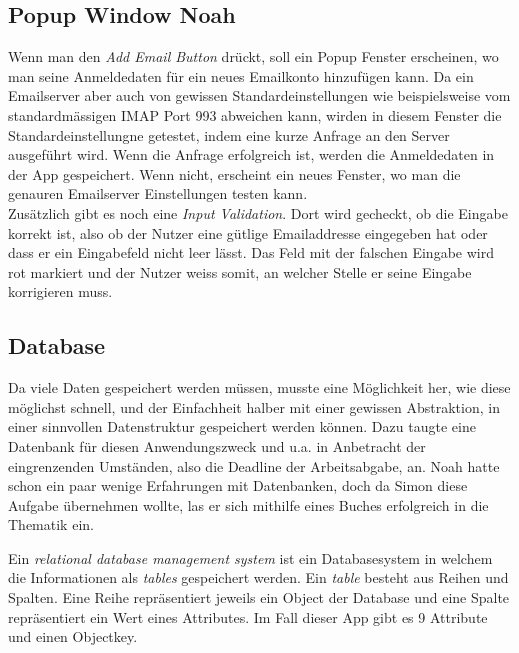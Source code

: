 \documentclass[a4paper,11pt]{article}
\begin{document}
\subsection{Popup Window Noah }
Wenn man den \textit{Add Email Button} drückt, soll ein Popup Fenster erscheinen, wo man seine Anmeldedaten für ein neues Emailkonto hinzufügen kann. Da ein Emailserver aber auch von gewissen Standardeinstellungen wie beispielsweise vom standardmässigen IMAP Port 993 abweichen kann, wirden in diesem Fenster die Standardeinstellungne getestet, indem eine kurze Anfrage an den Server ausgeführt wird. Wenn die Anfrage erfolgreich ist, werden die Anmeldedaten in der App gespeichert. Wenn nicht, erscheint ein neues Fenster, wo man die genauren Emailserver Einstellungen testen kann.\\

Zusätzlich gibt es noch eine \textit{Input Validation}. Dort wird gecheckt, ob die Eingabe korrekt ist, also ob der Nutzer eine gütlige Emailaddresse eingegeben hat oder dass er ein Eingabefeld nicht leer lässt. Das Feld mit der falschen Eingabe wird rot markiert und der Nutzer weiss somit, an welcher Stelle er seine Eingabe korrigieren muss.

\subsection{Database}


Da viele Daten gespeichert werden müssen, musste eine Möglichkeit her, wie diese möglichst schnell, und der Einfachheit halber mit einer gewissen Abstraktion, in einer sinnvollen Datenstruktur gespeichert werden können. Dazu taugte eine Datenbank für diesen Anwendungszweck und u.a. in Anbetracht der eingrenzenden Umständen, also die Deadline der Arbeitsabgabe, an. Noah hatte schon ein paar wenige Erfahrungen mit Datenbanken, doch da Simon diese Aufgabe übernehmen wollte, las er sich mithilfe eines Buches \cite{riccardi2001} erfolgreich in die Thematik ein.


Ein \textit{relational database management system} ist ein Databasesystem in welchem die Informationen als \textit{tables} gespeichert werden. 
Ein \textit{table} besteht aus Reihen und Spalten. Eine Reihe repräsentiert jeweils ein Object der Database und eine Spalte repräsentiert ein Wert eines Attributes. Im Fall dieser App
gibt es 9 Attribute und einen Objectkey. \\
\end{document}
